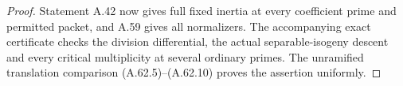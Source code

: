 \begin{proof}
Statement A.42 now gives full fixed inertia at every
coefficient prime and permitted packet, and A.59
gives all normalizers. The accompanying exact
certificate checks the division differential,
the actual separable-isogeny descent and every
critical multiplicity at several ordinary primes.
The unramified translation comparison
(A.62.5)--(A.62.10) proves the assertion uniformly.
\end{proof}
